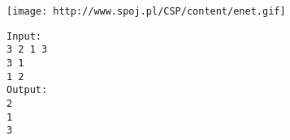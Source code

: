\texttt{[image: http://www.spoj.pl/CSP/content/enet.gif]}
\begin{verbatim}
Input:
3 2 1 3
3 1
1 2
Output:
2
1
3
\end{verbatim}